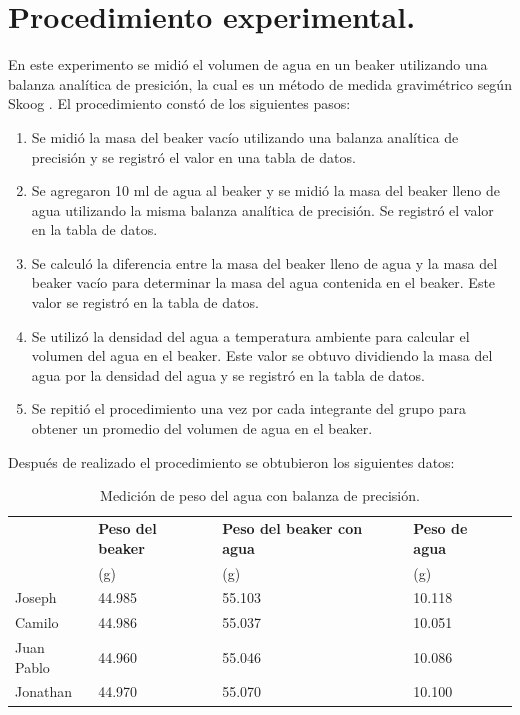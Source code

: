 \documentclass[letterpaper]{IEEEconf}
\begin{document}
\section{Procedimiento experimental.}
En este experimento se midió el volumen de agua en un beaker utilizando una balanza analítica de presición, la cual es un método de medida gravimétrico según Skoog \cite{Skoog2004}. El procedimiento constó de los siguientes pasos:
\begin{enumerate}[1.]
\item Se midió la masa del beaker vacío utilizando una balanza analítica de precisión y se registró el valor en una tabla de datos.
\item Se agregaron 10 ml de agua al beaker y se midió la masa del beaker lleno de agua utilizando la misma balanza analítica de precisión. Se registró el valor en la tabla de datos.
\item Se calculó la diferencia entre la masa del beaker lleno de agua y la masa del beaker vacío para determinar la masa del agua contenida en el beaker. Este valor se registró en la tabla de datos.
\item Se utilizó la densidad del agua a temperatura ambiente para calcular el volumen del agua en el beaker. Este valor se obtuvo dividiendo la masa del agua por la densidad del agua y se registró en la tabla de datos.
\item Se repitió el procedimiento una vez por cada integrante del grupo para obtener un promedio del volumen de agua en el beaker.
\end{enumerate}

Después de realizado el procedimiento se obtubieron los siguientes datos:

\begin{table}[H]
\centering
\begin{tabular}{|p{1.8cm}|p{1.4cm}|p{1.6cm}|p{1.4cm}|}
\hline
 & \bfseries Peso del beaker & \bfseries Peso del beaker con agua & \bfseries Peso de agua \\
 & (g) & (g) & (g) \\
\hline
Joseph & 44.985 & 55.103 & 10.118 \\
\hline
Camilo & 44.986 & 55.037 & 10.051 \\
\hline
Juan Pablo & 44.960 & 55.046 & 10.086 \\
\hline
Jonathan & 44.970 & 55.070 & 10.100 \\
\hline
\end{tabular}
\caption{Medición de peso del agua con balanza de precisión.}
\label{tab:peso}
\end{table}
\end{document}
